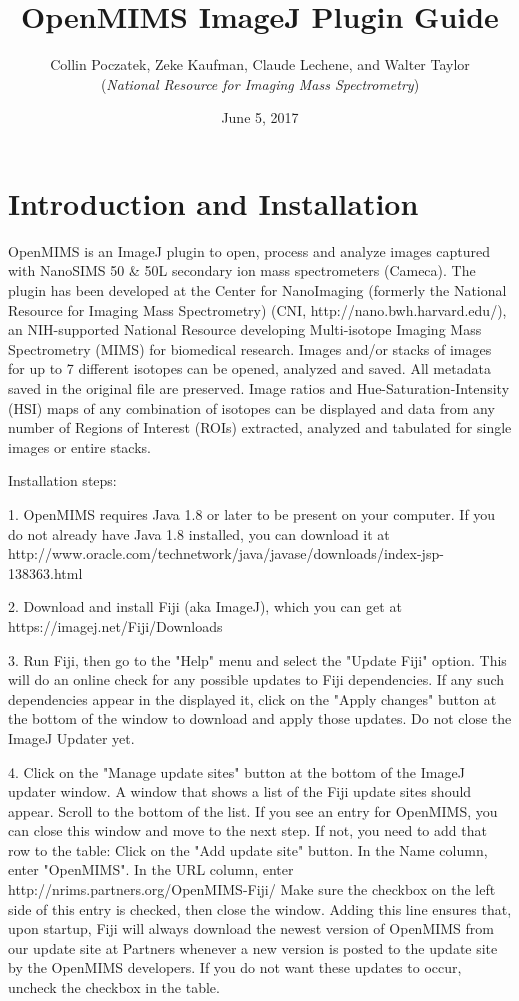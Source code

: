 \documentclass{article}
\title{\textbf{OpenMIMS ImageJ Plugin Guide}}
\date {June 5, 2017}
\author{Collin Poczatek, Zeke Kaufman, Claude Lechene, and Walter Taylor \\(\textit{National Resource for Imaging Mass Spectrometry})}
\begin{document}
\maketitle

\section*{Introduction and Installation }
	OpenMIMS is an ImageJ plugin to open, process and analyze images captured with
	NanoSIMS 50 \& 50L secondary ion mass spectrometers (Cameca). The plugin has been developed at the
	Center for NanoImaging (formerly the National Resource for Imaging Mass Spectrometry) (CNI, http://nano.bwh.harvard.edu/), an 
	NIH-supported National Resource developing Multi-isotope Imaging Mass Spectrometry (MIMS) for
	biomedical research. Images and/or stacks of images for up to 7 different isotopes can be opened, 
	analyzed and saved. All metadata saved in the original file are preserved. Image ratios and 
	Hue-Saturation-Intensity (HSI) maps of any combination of isotopes can be displayed and data 
	from any number of Regions of Interest (ROIs) extracted, analyzed and tabulated for single images 
	or entire stacks. 

	Installation steps:
	
	1. OpenMIMS requires Java 1.8 or later to be present on your computer.   If you do not already have Java 1.8 installed,  you can download it at http://www.oracle.com/technetwork/java/javase/downloads/index-jsp-138363.html
	
	2.  Download and install Fiji (aka ImageJ), which you can get at https://imagej.net/Fiji/Downloads
	
	3.  Run Fiji, then go to the "Help" menu and select the "Update Fiji" option.  This will do an online check for any possible updates to Fiji dependencies.  If any such dependencies appear in the displayed it, click on the "Apply changes" button at the bottom of the window to download and apply those updates.   Do not close the ImageJ Updater yet.
	
	4.  Click on the "Manage update sites" button at the bottom of the ImageJ updater window.  A window that shows a list of the Fiji update sites should appear.   Scroll to the bottom of the list.   If you see an entry for OpenMIMS, you can close this window and move to the next step.  If not, you need to add that row to the table:  Click on the "Add update site" button.   In the Name column, enter "OpenMIMS".  In the URL column, enter http://nrims.partners.org/OpenMIMS-Fiji/      Make sure the checkbox on the left side of this entry is checked,  then close the window.   Adding this line ensures that, upon startup, Fiji will always download the newest version of OpenMIMS from our update site at Partners whenever a new version is posted to the update site by the OpenMIMS developers.  If you do not want these updates to occur, uncheck the checkbox in the table.
	
\end{document}
